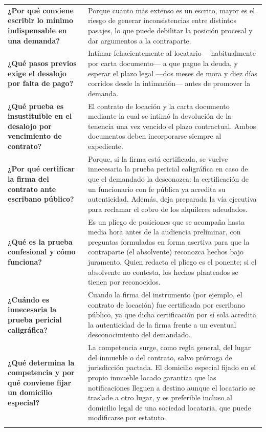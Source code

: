 \documentclass[12pt,oneside]{book}
\begin{document}
\begin{longtable}{
    >{\raggedright\arraybackslash}p{}
    >{\raggedright\arraybackslash}p{}
}
\textbf{¿Por qué conviene escribir lo mínimo indispensable en una demanda?} &
Porque cuanto más extenso es un escrito, mayor es el riesgo de generar inconsistencias entre distintos pasajes, lo que puede debilitar la posición procesal y dar argumentos a la contraparte. \\
\addlinespace

\textbf{¿Qué pasos previos exige el desalojo por falta de pago?} &
Intimar fehacientemente al locatario ---habitualmente por carta documento--- a que pague la deuda, y esperar el plazo legal ---dos meses de mora y diez días corridos desde la intimación--- antes de promover la demanda. \\
\addlinespace

\textbf{¿Qué prueba es insustituible en el desalojo por vencimiento de contrato?} &
El contrato de locación y la carta documento mediante la cual se intimó la devolución de la tenencia una vez vencido el plazo contractual. Ambos documentos deben incorporarse siempre al expediente. \\
\addlinespace

\textbf{¿Por qué certificar la firma del contrato ante escribano público?} &
Porque, si la firma está certificada, se vuelve innecesaria la prueba pericial caligráfica en caso de que el demandado la desconozca: la certificación de un funcionario con fe pública ya acredita su autenticidad. Además, deja preparada la vía ejecutiva para reclamar el cobro de los alquileres adeudados. \\
\addlinespace

\textbf{¿Qué es la prueba confesional y cómo funciona?} &
Es un pliego de posiciones que se acompaña hasta media hora antes de la audiencia preliminar, con preguntas formuladas en forma asertiva para que la contraparte (el absolvente) reconozca hechos bajo juramento. Quien redacta el pliego es el ponente; si el absolvente no contesta, los hechos planteados se tienen por reconocidos. \\
\addlinespace

\textbf{¿Cuándo es innecesaria la prueba pericial caligráfica?} &
Cuando la firma del instrumento (por ejemplo, el contrato de locación) fue certificada por escribano público, ya que dicha certificación por sí sola acredita la autenticidad de la firma frente a un eventual desconocimiento del demandado. \\
\addlinespace

\textbf{¿Qué determina la competencia y por qué conviene fijar un domicilio especial?} &
La competencia surge, como regla general, del lugar del inmueble o del contrato, salvo prórroga de jurisdicción pactada. El domicilio especial fijado en el propio inmueble locado garantiza que las notificaciones lleguen a destino aunque el locatario se traslade a otro lugar, y es preferible incluso al domicilio legal de una sociedad locataria, que puede modificarse por estatuto. \\
\addlinespace


\end{longtable}
\end{document}
